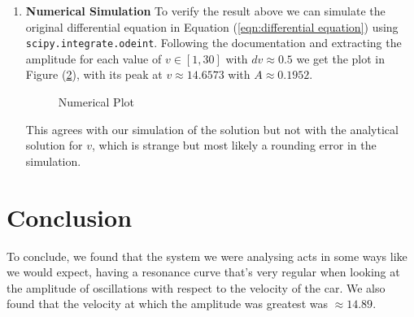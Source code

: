 \documentclass[12pt]{article}
\begin{document}
\begin{enumerate}
        And that is the value of $v$ for which the oscillations have a maximum amplitude. To find 
        that amplitude we can plot Equation (\ref{eqn:max amplitude soln}) using Python and extract the 
        maximum amplitude. Below in Figure (\ref{fig:analytical}) we have plotted the amplitude of 
        oscillations for various values of $v$. This has a shape very similar to a resonance curve 
        and peaks at $v \approx 14.6573$ with a value of $A \approx 0.1952$.

        \begin{figure}[H]
            \begin{center}
                \scalebox{.7}{}
                \caption{Analytical Plot}
                \label{fig:analytical}
            \end{center}
        \end{figure}

        \item \textbf{Numerical Simulation} \newline
        To verify the result above we can simulate the original differential equation in Equation 
        (\ref{eqn:differential equation}) using \texttt{scipy.integrate.odeint}. Following the 
        documentation and extracting the amplitude for each value of $v \in [1, 30]$ with $dv \approx 0.5$ 
        we get the plot in Figure (\ref{fig:numerical}), with its peak at $v \approx 14.6573$ with 
        $A \approx 0.1952$.

        \begin{figure}[H]
            \begin{center}
               \scalebox{.7}{}
               \caption{Numerical Plot}
               \label{fig:numerical}
            \end{center}
        \end{figure}

        This agrees with our simulation of the solution but not with the analytical solution for $v$, 
        which is strange but most likely a rounding error in the simulation. 
        
    \end{enumerate}

    \section*{Conclusion}
    To conclude, we found that the system we were analysing acts in some ways like we would expect, 
    having a resonance curve that's very regular when looking at the amplitude of oscillations with 
    respect to the velocity of the car. We also found that the velocity at which the amplitude was 
    greatest was $\approx 14.89$.
\end{document}
